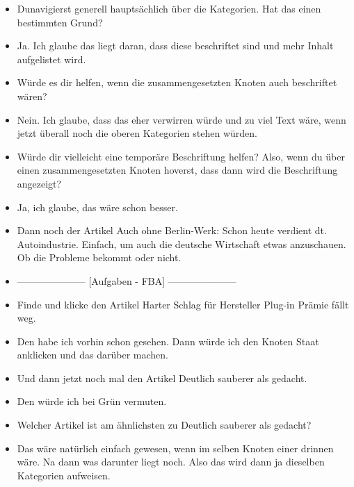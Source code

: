 {\begin{itemize}[]
                  In dem Sinne, dass ich mir sozusagen einen Vorschlag aussuche.
                  Also sozusagen: Schlag mir etwas von der Kategorie Staat vor.
            \item {} Dunavigierst generell hauptsächlich über die Kategorien. Hat das einen bestimmten Grund?
            \item {} Ja. Ich glaube das liegt daran, dass diese beschriftet sind und mehr Inhalt aufgelistet wird.
            \item {} Würde es dir helfen, wenn die zusammengesetzten Knoten auch beschriftet wären?
            \item {} Nein. Ich glaube, dass das eher verwirren würde und zu viel Text wäre, wenn jetzt überall noch die oberen Kategorien stehen würden.
            \item {} Würde dir vielleicht eine temporäre Beschriftung helfen? Also, wenn du über einen zusammengesetzten Knoten hoverst, dass dann wird die Beschriftung angezeigt?
            \item {} Ja, ich glaube, das wäre schon besser.
            \item {} Dann noch der Artikel \flqq Auch ohne Berlin-Werk: Schon heute verdient dt. Autoindustrie\frqq{}.
                  Einfach, um auch die deutsche Wirtschaft etwas anzuschauen.
                  Ob die Probleme bekommt oder nicht.
            \item {---------------------} [Aufgaben - FBA] {---------------------}
            \item {} Finde und klicke den Artikel \flqq Harter Schlag für Hersteller Plug-in Prämie fällt weg\frqq{}.
            \item {} Den habe ich vorhin schon gesehen.
                  Dann würde ich den Knoten Staat anklicken und das darüber machen.
            \item {} Und dann jetzt noch mal den Artikel \flqq Deutlich sauberer als gedacht\frqq{}.
            \item {} Den würde ich bei Grün vermuten.
            \item {} Welcher Artikel ist am ähnlichsten zu \flqq Deutlich sauberer als gedacht\frqq{}?
            \item {} Das wäre natürlich einfach gewesen, wenn im selben Knoten einer drinnen wäre.
                  Na dann was darunter liegt noch. Also das wird dann ja dieselben Kategorien aufweisen.

\end{itemize}}
